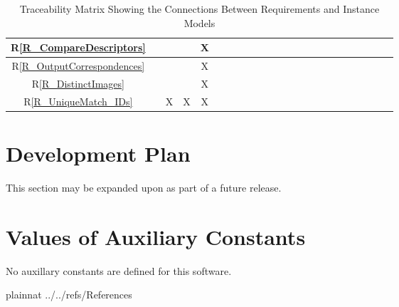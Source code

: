 \documentclass[12pt]{article}
\newcommand{\rref}[1]{R\ref{#1}}
\begin{document}
\begin{landscape}
\begin{table}[h!]
\begin{tabular}{|c|c|c|c|c|c|c|c|c|c|c|c|c|c|c|c|c|c|c|c|c|c|c|}
\rref{R_CompareDescriptors}     & & & &X& & & & & & & & & & & & & & & \\ \hline
\rref{R_OutputCorrespondences}  & & & &X& & & & & & & & & & & & & & & \\ \hline
\rref{R_DistinctImages}         & & & &X& & & & & & & & & & & & & & & \\ \hline
\rref{R_UniqueMatch_IDs}        & &X&X&X& & & & & & & & & & & & & & & \\ \hline
\hline
\end{tabular}
\caption{Traceability Matrix Showing the Connections Between Requirements and Instance Models}
\label{Table:R_trace}
\end{table}
\end{landscape}

\section{Development Plan}
This section may be expanded upon as part of a future release.

\section{Values of Auxiliary Constants}
No auxillary constants are defined for this software.

\newpage
 {plainnat}
 {../../refs/References}
\end{document}
